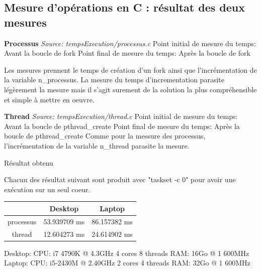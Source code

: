 \documentclass[12pt]{article}
\begin{document}
	\subsection{Mesure d'opérations en C : résultat des deux mesures}

		\textbf{Processus}\newline
		\textit{Source: tempsExecution/processus.c} \newline
		Point initial de mesure du temps: Avant la boucle de fork \newline
		Point final de mesure du temps: Après la boucle de fork \newline
		\newline

		Les mesures prennent le temps de création d'un fork ainsi que l'incrémentation
		de la variable n\_processus. La mesure du temps d'incrementation parasite
		légèrement la mesure mais il s'agit surement de la solution la plus
		compréhensible et simple à mettre en oeuvre.\newline
		\newline

		\textbf{Thread}\newline
		\textit{Source: tempsExecution/thread.c}\newline
		Point initial de mesure du temps: Avant la boucle de pthread\_create\newline
		Point final de mesure du temps: Après la boucle de pthread\_create\newline
		\newline
		Comme pour la messure des processus, l'incrémentation de la variable
		n\_thread parasite la mesure.\newline

		Résultat obtenu

		Chacun des résultat suivant sont produit avec "taskset -c 0" pour avoir
		une exécution sur un seul coeur.

		\begin{center}
		  \begin{tabular}{ | c | c | c | }
				\hline
					&	Desktop      &    Laptop \\
				\hline
					processus & 53.939709 ms  &     86.157382 ms \\
				\hline
					thread    & 12.604273 ms  &      24.614902 ms \\
				\hline
			\end{tabular}
		\end{center}

		Desktop: CPU: i7 4790K @ 4.3GHz 4 cores 8 threads RAM: 16Go @ 1 600MHz
		Laptop: CPU: i5-2430M @ 2.40GHz 2 cores 4 threads RAM: 32Go @ 1 600MHz
\end{document}
